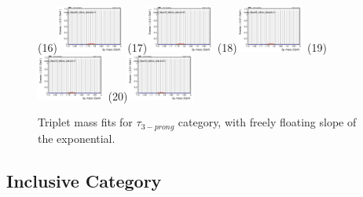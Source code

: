 \begin{figure}[h!]
        \subfigure(16){\includegraphics[width=0.2\textwidth]{unfixed_exp/plots/tauhB/massfit_tauhB_40bins_bdtcut0.31.png}}
        \subfigure(17){\includegraphics[width=0.2\textwidth]{unfixed_exp/plots/tauhB/massfit_tauhB_40bins_bdtcut0.35.png}}
        \subfigure(18){\includegraphics[width=0.2\textwidth]{unfixed_exp/plots/tauhB/massfit_tauhB_40bins_bdtcut0.41.png}}
        \subfigure(19){\includegraphics[width=0.2\textwidth]{unfixed_exp/plots/tauhB/massfit_tauhB_40bins_bdtcut0.47.png}}
        \subfigure(20){\includegraphics[width=0.2\textwidth]{unfixed_exp/plots/tauhB/massfit_tauhB_40bins_bdtcut0.53.png}}
        \caption{Triplet mass fits for $\tau_{3-prong}$ category, with freely floating slope of the exponential.}
        \label{fig:unfixed_tauhb}
\end{figure}

\newpage

\subsection{Inclusive Category}
\label{sec:all_cat}

